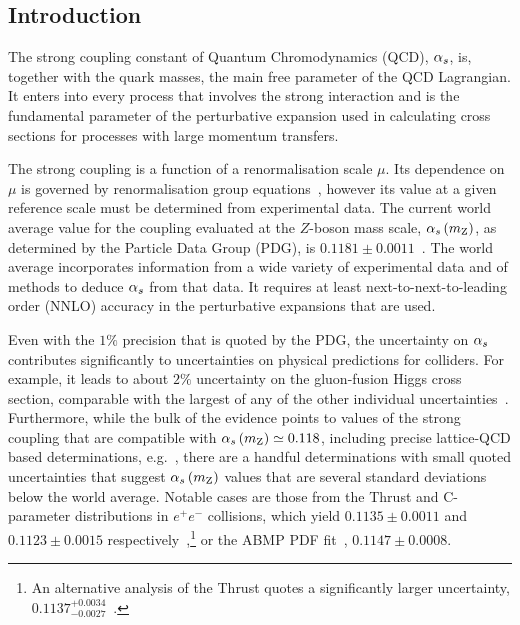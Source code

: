 \subsection{Introduction}

The strong coupling constant of Quantum Chromodynamics (QCD), $\alpha_s$,
is, together with the quark masses, the main free parameter of the QCD
Lagrangian. 
%
It enters into every process that involves the strong interaction and
is the fundamental parameter of the perturbative expansion used in
calculating cross sections for processes with large momentum
transfers.

The strong coupling is a function of a renormalisation scale $\mu$.
%
Its dependence on $\mu$ is governed by renormalisation group
equations~\cite{Baikov:2016tgj,Herzog:2017ohr}, however its value at a given reference
scale must be determined from experimental data.
%
The current world average value for the coupling evaluated at the
$Z$-boson mass scale, $\alpha_s \left( m_\mathrm{Z} \right) $, as determined by the Particle Data
Group (PDG), is $0.1181 \pm 0.0011$~\cite{PDG}.
%
The world average incorporates information from a wide variety of
experimental data and of methods to deduce $\alpha_s$ from that data.
%
It requires at least next-to-next-to-leading order (NNLO) accuracy in
the perturbative expansions that are used.

Even with the $1\%$ precision that is quoted by the PDG, the
uncertainty on $\alpha_s$ contributes significantly to uncertainties on
physical predictions for colliders.
%
For example, it leads to about $2\%$ uncertainty on the gluon-fusion
Higgs cross section, comparable with the largest of any of the other
individual uncertainties~\cite{Anastasiou:2016cez}.
% 
Furthermore, while the bulk of the evidence points to values of the
strong coupling that are compatible with $\alpha_s \left( m_\mathrm{Z} \right)  \simeq 0.118$,
including precise lattice-QCD based
determinations, e.g.~\cite{PDG,Aoki:2016frl,McNeile:2010ji,Bruno:2017gxd},
%
there are a handful determinations with small quoted uncertainties
that suggest $\alpha_s \left( m_\mathrm{Z} \right) $ values that are several standard deviations below
the world average. 
%
Notable cases are those from the
Thrust and C-parameter distributions in $e^+e^-$ collisions, which
yield $0.1135 \pm 0.0011$ and $0.1123 \pm 0.0015$
respectively~\cite{Abbate:2010xh,Hoang:2015hka},\footnote{ An
  alternative analysis of the Thrust quotes a significantly larger
  uncertainty, $0.1137^{+0.0034}_{-0.0027}$~\cite{Gehrmann:2012sc}.}
%
or the ABMP PDF fit~\cite{Alekhin:2017kpj}, $0.1147\pm0.0008$.

